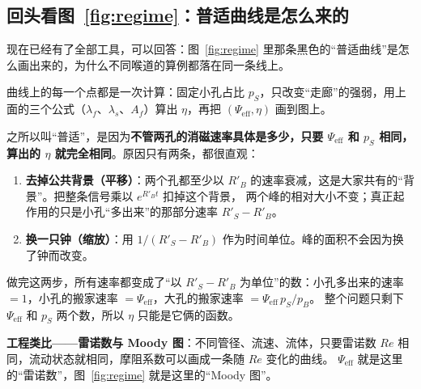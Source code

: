 \documentclass[11pt,a4paper]{article}
\newcommand{\Peff}{\Psi_{\mathrm{eff}}}
\begin{document}
\subsection{回头看图~\ref{fig:regime}：普适曲线是怎么来的}
\label{sec:universal}

现在已经有了全部工具，可以回答：图~\ref{fig:regime} 里那条黑色的“普适曲线”是怎么画出来的，为什么不同喉道的算例都落在同一条线上。

\begin{intuit}
曲线上的每一个点都是一次计算：固定小孔占比 $p_S$，只改变“走廊”的强弱，用上面的三个公式（$\lambda_f$、$\lambda_s$、$A_f$）算出 $\eta$，再把 $(\Peff,\eta)$ 画到图上。

之所以叫“普适”，是因为\textbf{不管两孔的消磁速率具体是多少，只要 $\Peff$ 和 $p_S$ 相同，算出的 $\eta$ 就完全相同}。原因只有两条，都很直观：
\begin{enumerate}[leftmargin=1.6em,itemsep=1pt]
\item \textbf{去掉公共背景（平移）}：两个孔都至少以 $R'_B$ 的速率衰减，这是大家共有的“背景”。把整条信号乘以 $e^{R'_Bt}$ 扣掉这个背景，
两个峰的相对大小不变；真正起作用的只是小孔“多出来”的那部分速率 $R'_S-R'_B$。
\item \textbf{换一只钟（缩放）}：用 $1/(R'_S-R'_B)$ 作为时间单位。峰的面积不会因为换了钟而改变。
\end{enumerate}
做完这两步，所有速率都变成了“以 $R'_S-R'_B$ 为单位”的数：小孔多出来的速率 $=1$，小孔的搬家速率 $=\Peff$，大孔的搬家速率 $=\Peff\,p_S/p_B$。
整个问题只剩下 $\Peff$ 和 $p_S$ 两个数，所以 $\eta$ 只能是它俩的函数。

\textbf{工程类比——雷诺数与 Moody 图}：不同管径、流速、流体，只要雷诺数 $Re$ 相同，流动状态就相同，摩阻系数可以画成一条随 $Re$ 变化的曲线。
$\Peff$ 就是这里的“雷诺数”，图~\ref{fig:regime} 就是这里的“Moody 图”。
\end{intuit}
\end{document}
